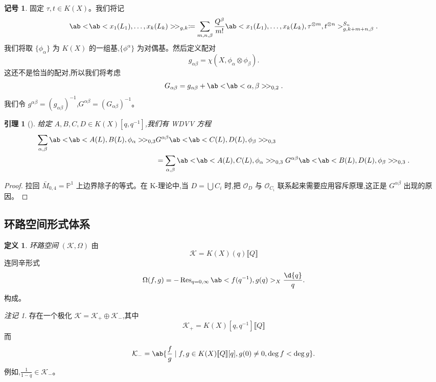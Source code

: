 \documentclass{amsart}
\newtheorem{lem}[thm]{引理}
\theoremstyle{definition}
\newtheorem{defn}[thm]{定义}
\newtheorem{notn}[thm]{记号}
\theoremstyle{remark}
\newtheorem{rmk}[thm]{注记}
\theoremstyle{plain}
\theoremstyle{definition}
\theoremstyle{remark}
\renewcommand{\P}{\mathbb{P}}
\newcommand{\mc}[1]{\mathcal{#1}}
\newcommand{\on}[1]{\operatorname{#1}}
\newcommand{\1}{\mathbf{1}}
\newcommand{\2}{\mathbf{2}}
\newcommand{\3}{\mathbf{3}}
\newcommand{\ps}[1]{\llbracket #1 \rrbracket}
\begin{document}
\begin{notn}
    固定 \(\tau, t \in K(X)\)。我们将记
    \[ \ab<\!\ab<x_1(L_1), \ldots, x_k(L_k)>\!>_{g,k} \coloneqq \sum_{m,n,\beta} \frac{Q^{\beta}}{m!} \ab<x_1(L_1), \ldots, x_k(L_k), \tau^{\otimes m}, t^{\otimes n}>_{g,k+m+n,\beta}^{S_n}. \]
    我们将取 \(\{\phi_{\alpha}\}\) 为 \(K(X)\) 的一组基,\(\{\phi^{\alpha}\}\) 为对偶基。然后定义配对
    \[ g_{\alpha\beta} = \chi(X, \phi_{\alpha} \otimes \phi_{\beta}). \]
    这还不是恰当的配对,所以我们将考虑
    \[ G_{\alpha\beta} = g_{\alpha\beta} + \ab<\!\ab<\alpha,\beta>\!>_{0,2}. \]
    我们令 \(g^{\alpha\beta} = (g_{\alpha\beta})^{-1}\),\(G^{\alpha\beta} = (G_{\alpha\beta})^{-1}\)。
\end{notn}

\begin{lem}[{\cite{Givental2000K}}]
    给定 \(A,B,C,D \in K(X)[q,q^{-1}]\),我们有 \textit{WDVV 方程}
    \begin{align*}
        \sum_{\alpha,\beta} \ab<\!\ab< A(L), B(L), \phi_{\alpha}>\! >_{0,3}& G^{\alpha\beta}\ab<\!\ab< C(L), D(L), \phi_{\beta}>\! >_{0,3} \\
        &= \sum_{\alpha,\beta} \ab<\!\ab< A(L), C(L), \phi_{\alpha}>\! >_{0,3} G^{\alpha\beta}\ab<\!\ab< B(L), D(L), \phi_{\beta}>\! >_{0,3}.
    \end{align*}
\end{lem}

\begin{proof}
    拉回 \(\bar{M}_{0,4} = \P^1\) 上边界除子的等式。在 K-理论中,当 \(D = \bigcup C_i\) 时,把 \(\mc{O}_D\) 与 \(\mc{O}_{C_i}\) 联系起来需要应用容斥原理,这正是 \(G^{\alpha\beta}\) 出现的原因。
\end{proof}

\subsection{环路空间形式体系}%
\label{sub:Loop space formalism}

\begin{defn}
    \textit{环路空间} \((\mc{K}, \Omega)\) 由
    \[ \mc{K} = K(X)(q) \ps{Q}\]
    连同辛形式
    \[ \Omega(f, g) = - \on{Res}_{q = 0, \infty} \ab<f(q^{-1}), g(q)>_X \frac{\d{q}}{q}. \]
    构成。
\end{defn}

\begin{rmk}
    存在一个极化 \(\mc{K} = \mc{K}_+ \oplus \mc{K}_-\),其中
    \[ \mc{K}_+ = K(X)[q, q^{-1}]\ps{Q} \]
    而
    \[ \mc{K}_- = \ab\{ \frac{f}{g} \mid f, g \in K(X)\ps{Q}[q], g(0) \neq 0, \deg f < \deg g\}. \]
    例如,\(\frac{1}{1-q} \in \mc{K}_-\)。
\end{rmk}
\end{document}
